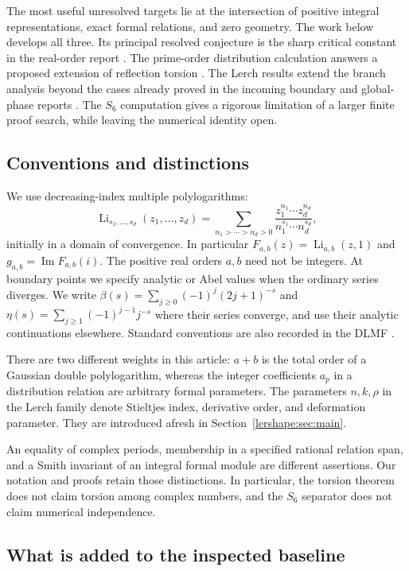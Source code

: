 \documentclass[11pt,a4paper]{article}
\numberwithin{equation}{section}
\theoremstyle{definition}
\theoremstyle{remark}
\DeclareMathOperator{\Li}{Li}
\renewcommand{\Im}{\operatorname{Im}}
\begin{document}
The most useful unresolved targets lie at the intersection of positive
integral representations, exact formal relations, and zero geometry.
The work below develops all three. Its principal resolved conjecture is
the sharp critical constant in the real-order report \cite{realorder}.
The prime-order distribution calculation answers a proposed extension
of reflection torsion \cite{integraljets}. The Lerch results extend the
branch analysis beyond the cases already proved in the incoming
boundary and global-phase reports \cite{lershape:Boundary,lershape:Globalphase}.
The $S_6$ computation gives a rigorous limitation of a larger finite
proof search, while leaving the numerical identity open.

\subsection{Conventions and distinctions}

We use decreasing-index multiple polylogarithms:
\[
 \Li_{s_1,\ldots,s_d}(z_1,\ldots,z_d)
 =\sum_{n_1>\cdots>n_d>0}
   \frac{z_1^{n_1}\cdots z_d^{n_d}}
        {n_1^{s_1}\cdots n_d^{s_d}},
\]
initially in a domain of convergence. In particular
$F_{a,b}(z)=\Li_{a,b}(z,1)$ and $g_{a,b}=\Im F_{a,b}(i)$.
The positive real orders $a,b$ need not be integers. At boundary points
we specify analytic or Abel values when the ordinary series diverges.
We write $\beta(s)=\sum_{j\ge0}(-1)^j(2j+1)^{-s}$ and
$\eta(s)=\sum_{j\ge1}(-1)^{j-1}j^{-s}$ where their series converge,
and use their analytic continuations elsewhere. Standard conventions
are also recorded in the DLMF \cite{dlmf-polylog,dlmf-hurwitz}.

There are two different weights in this article: $a+b$ is the total
order of a Gaussian double polylogarithm, whereas the integer coefficients
$a_p$ in a distribution relation are arbitrary formal parameters.
The parameters $n,k,\rho$ in the Lerch family denote Stieltjes index,
derivative order, and deformation parameter. They are introduced afresh
in Section~\ref{lershape:sec:main}.

An equality of complex periods, membership in a specified rational
relation span, and a Smith invariant of an integral formal module are
different assertions. Our notation and proofs retain those distinctions.
In particular, the torsion theorem does not claim torsion among complex
numbers, and the $S_6$ separator does not claim numerical independence.

\subsection{What is added to the inspected baseline}
\end{document}
